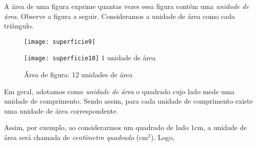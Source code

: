 A área de uma figura exprime quantas vezes essa figura contém uma \textit{unidade de área}. Observe a figura a seguir. Consideramos a unidade de área como cada triângulo.
\begin{multicols}{2}
\begin{figure}[H]
\centering

\texttt{[image: superficie9]}
\end{figure}
\columnbreak

\null\vfill
\begin{figure}[H]
\centering

\texttt{[image: superficie10]}
$1$ unidade de área

\medskip

Área de figura: 12 unidades de área
\end{figure}
\vfill\null
\end{multicols}

Em geral, adotamos como \textit{unidade de área} o quadrado cujo lado mede uma unidade de comprimento. Sendo assim, para cada unidade de comprimento existe uma unidade de área correspondente.

\begin{figure}[H]
\centering

\end{figure}

Assim, por exemplo, ao considerarmos um quadrado de lado $1$cm, a unidade de área será chamada de \textit{centímetro quadrado} (cm$^2$). Logo,



\begin{figure}[H]
\centering

\end{figure}

